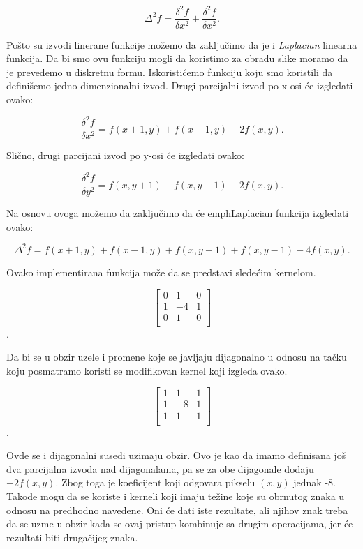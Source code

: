 \documentclass[a4paper,12pt,titlepage]{article}
\begin{document}
\begin{equation}\label{eq:grad}
\Delta^{2}f = \dfrac{\delta^{2}f}{\delta x^{2}} + \dfrac{\delta^{2}f}{\delta x^{2}}. 
\end{equation}

Pošto su izvodi linerane funkcije možemo da zaključimo da je i \emph{Laplacian} linearna funkcija. Da bi smo ovu funkciju mogli da koristimo za obradu slike moramo da je prevedemo u diskretnu formu. Iskoristićemo funkciju koju smo koristili da definišemo jedno-dimenzionalni izvod. Drugi parcijalni izvod po x-osi će izgledati ovako:

\begin{equation}\label{eq:grad2}
\dfrac{\delta^{2}f}{\delta x^{2}} = f(x + 1, y) + f(x - 1, y) - 2f(x, y).
\end{equation}

Slično, drugi parcijani izvod po y-osi će izgledati ovako:

\begin{equation}\label{eq:grad3}
\dfrac{\delta^{2}f}{\delta y^{2}} = f(x, y + 1) + f(x, y - 1) - 2f(x, y).
\end{equation}

Na osnovu ovoga možemo da zaključimo da će emph{Laplacian} funkcija izgledati ovako:

\begin{equation}\label{eq:grad4}
\Delta^{2}f = f(x + 1, y) + f(x - 1, y) + f(x, y + 1) + f(x, y - 1) - 4f(x, y). 
\end{equation}

Ovako implementirana funkcija može da se predstavi sledećim kernelom.

\[
\begin{bmatrix}
     0 & 1 & 0 \\
     1 & -4 & 1 \\
     0 & 1 & 0 \\
\end{bmatrix}
\]. 

Da bi se u obzir uzele i promene koje se javljaju dijagonalno u odnosu na tačku koju posmatramo koristi se modifikovan kernel koji izgleda ovako.

\[
\begin{bmatrix}
     1 & 1 & 1 \\
     1 & -8 & 1 \\
     1 & 1 & 1 \\
\end{bmatrix}
\].

Ovde se i dijagonalni susedi uzimaju obzir. Ovo je kao da imamo definisana još dva parcijalna izvoda nad dijagonalama, pa se za obe dijagonale dodaju $-2f(x, y)$. Zbog toga je koeficijent koji odgovara pikselu $(x, y)$ jednak -8. Takođe mogu da se koriste i kerneli koji imaju težine koje su obrnutog znaka u odnosu na predhodno navedene. Oni će dati iste rezultate, ali njihov znak treba da se uzme u obzir kada se ovaj pristup kombinuje sa drugim operacijama, jer će rezultati biti drugačijeg znaka.
\end{document}

